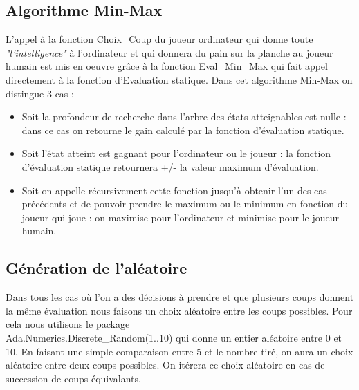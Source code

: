 \documentclass[a4paper, 10pt, french]{article}
\begin{document}
{    \subsection{Algorithme Min-Max}
    {
    L'appel à la fonction Choix\_Coup du joueur ordinateur qui donne toute {\em "l'intelligence"} à l'ordinateur et qui donnera du pain sur la planche au joueur humain est mis en oeuvre grâce à la fonction Eval\_Min\_Max qui fait appel directement à la fonction d'Evaluation statique.
    Dans cet algorithme Min-Max on distingue 3 cas :
    \begin{itemize}
            \item Soit la profondeur de recherche dans l'arbre des états atteignables est nulle : dans ce cas on retourne le gain calculé par la fonction d'évaluation statique. 
            \item Soit l'état atteint est gagnant pour l'ordinateur ou le joueur : la fonction d'évaluation statique retournera +/- la valeur maximum d'évaluation.
            \item Soit on appelle récursivement cette fonction jusqu'à obtenir l'un des cas précédents et de pouvoir prendre le maximum ou le minimum en fonction du joueur qui joue : on maximise pour l'ordinateur et minimise pour le joueur humain.
        \end{itemize}
    }

    \subsection{Génération de l'aléatoire}
    {
    Dans tous les cas où l'on a des décisions à prendre et que plusieurs coups donnent la même évaluation nous faisons un choix aléatoire entre les coups possibles.
    Pour cela nous utilisons le package \\Ada.Numerics.Discrete\_Random(1..10) qui donne un entier aléatoire entre 0 et 10. En faisant une simple comparaison entre 5 et le nombre tiré, on aura un choix aléatoire entre deux coups possibles. On itérera ce choix aléatoire en cas de succession de coups équivalants. 
    }
}   
\end{document}
